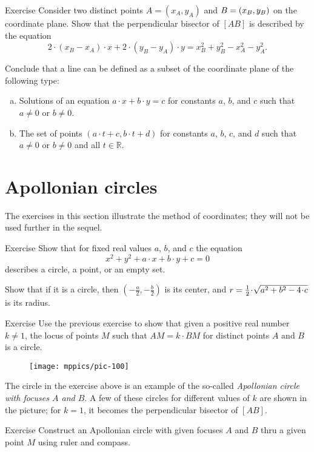 \begin{thm}[!]{Exercise}\label{ex:line-coord}
Consider two distinct points $A=(x_A,y_A)$ and $B=(x_B,y_B)$ on the coordinate plane.
Show that the perpendicular bisector of $[AB]$ is described by the equation
\[2\cdot (x_B-x_A)\cdot x+2\cdot (y_B-y_A)\cdot y=x_B^2+y_B^2-x_A^2-y_A^2.\]

Conclude that a line can be defined as a subset of the coordinate plane of the following type:
\begin{enumerate}[(a)]
\item  Solutions of an equation $a\cdot x+b\cdot y=c$
for constants $a$, $b$, and $c$ such that $a\ne 0$ or $b\ne0$.
\item\label{ex:line-coord:parameter} The set of points $(a\cdot t+c,b\cdot t+d)$ for constants $a$, $b$, $c$, and $d$ such that $a\ne 0$ or $b\ne0$ and all $t\in \mathbb{R}$.
\end{enumerate}

\end{thm}

\section{Apollonian circles}\label{sec:Apollonian circle}
The exercises in this section illustrate the method of coordinates; they will not be used further in the sequel.

\begin{thm}{Exercise}\label{ex:circle-coord}
Show that for fixed real values $a$, $b$, and $c$ the equation 
\[x^2+y^2+a\cdot x+b\cdot y+c=0\]
describes a circle, a point, or an empty set.

Show that if it is a circle, then $(-\tfrac a2,-\tfrac b2)$ is its center,
and $r\z=\tfrac12\cdot \sqrt{a^2+b^2-4\cdot c}$ is its radius.
\end{thm}

\begin{thm}{Exercise}\label{ex:apolonnius}
Use the previous exercise to show that given a positive real number $k\ne1$,
the locus of points $M$ such that $AM=k\cdot BM$ 
for distinct points $A$ and $B$
is a circle. 
\end{thm}

\begin{figure}[!ht]
\centering
\texttt{[image: mppics/pic-100]}
\end{figure}

The circle in the exercise above is an example of the so-called \emph{Apollonian circle with focuses $A$ and $B$}.
A few of these circles for different values of $k$ are shown in the picture;
for $k=1$, it becomes the perpendicular bisector of $[AB]$.


\begin{thm}{Exercise}\label{ex:apolonnius-construction}
Construct an Apollonian circle with given focuses $A$ and $B$ thru a given point $M$ using ruler and compass.
\end{thm}
